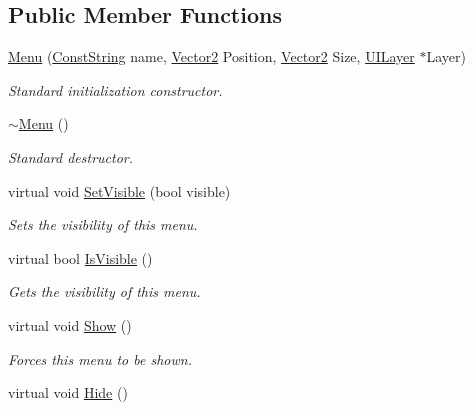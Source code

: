 \subsection*{Public Member Functions}
\begin{DoxyCompactItemize}
\item 
\hyperlink{classphys_1_1UI_1_1Menu_a1ac37cef302ff52d80218bc2cceb30ba}{Menu} (\hyperlink{namespacephys_a5ce5049f8b4bf88d6413c47b504ebb31}{ConstString} name, \hyperlink{classphys_1_1Vector2}{Vector2} Position, \hyperlink{classphys_1_1Vector2}{Vector2} Size, \hyperlink{classphys_1_1UILayer}{UILayer} $\ast$Layer)
\begin{DoxyCompactList}\small\item\em Standard initialization constructor. \item\end{DoxyCompactList}\item 
\hypertarget{classphys_1_1UI_1_1Menu_a54b60c45238a3655da9dfa83104adb18}{
\hyperlink{classphys_1_1UI_1_1Menu_a54b60c45238a3655da9dfa83104adb18}{$\sim$Menu} ()}
\label{d6/dd3/classphys_1_1UI_1_1Menu_a54b60c45238a3655da9dfa83104adb18}

\begin{DoxyCompactList}\small\item\em Standard destructor. \item\end{DoxyCompactList}\item 
virtual void \hyperlink{classphys_1_1UI_1_1Menu_a4847e0de055a9c2f708f98742fa59a87}{SetVisible} (bool visible)
\begin{DoxyCompactList}\small\item\em Sets the visibility of this menu. \item\end{DoxyCompactList}\item 
virtual bool \hyperlink{classphys_1_1UI_1_1Menu_ae23321617d7e14448e2fab3b455c3dc7}{IsVisible} ()
\begin{DoxyCompactList}\small\item\em Gets the visibility of this menu. \item\end{DoxyCompactList}\item 
\hypertarget{classphys_1_1UI_1_1Menu_aeb6373cc1be7da0bf5966129f271c861}{
virtual void \hyperlink{classphys_1_1UI_1_1Menu_aeb6373cc1be7da0bf5966129f271c861}{Show} ()}
\label{d6/dd3/classphys_1_1UI_1_1Menu_aeb6373cc1be7da0bf5966129f271c861}

\begin{DoxyCompactList}\small\item\em Forces this menu to be shown. \item\end{DoxyCompactList}\item 
\hypertarget{classphys_1_1UI_1_1Menu_a23f7b18c8bae528dc15bf8f3ff40d435}{
virtual void \hyperlink{classphys_1_1UI_1_1Menu_a23f7b18c8bae528dc15bf8f3ff40d435}{Hide} ()}
\label{d6/dd3/classphys_1_1UI_1_1Menu_a23f7b18c8bae528dc15bf8f3ff40d435}


\end{DoxyCompactItemize}
